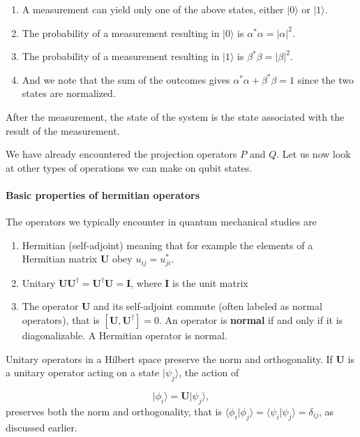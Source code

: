 \begin{enumerate}
\item A measurement can yield only one of the above states, either $\vert 0\rangle$ or $\vert 1\rangle$.

\item The probability of a measurement resulting in $\vert 0\rangle$ is $\alpha^*\alpha = \vert \alpha \vert^2$.

\item The probability of a measurement resulting in $\vert 1\rangle$ is $\beta^*\beta = \vert \beta \vert^2$.

\item And we note that the sum of the outcomes gives $\alpha^*\alpha+\beta^*\beta=1$ since the two states are normalized.
\end{enumerate}


After the measurement, the state of the system is the state associated with the result of the measurement.

We have already encountered the projection operators $P$ and $Q$. Let
us now look at other types of operations we can make on qubit states.


\paragraph{Basic properties of hermitian operators}

The operators we typically encounter in quantum mechanical studies are
\begin{enumerate}
\item Hermitian (self-adjoint) meaning that for example the elements of a Hermitian matrix $\bm{U}$ obey $u_{ij}=u_{ji}^*$.

\item Unitary $\bm{U}\bm{U}^{\dagger}=\bm{U}^{\dagger}\bm{U}=\bm{I}$, where $\bm{I}$ is the unit matrix

\item The operator $\bm{U}$ and its self-adjoint commute (often labeled as normal operators), that is  $[\bm{U},\bm{U}^{\dagger}]=0$. An operator is \textbf{normal} if and only if it is diagonalizable. A Hermitian operator is normal.
\end{enumerate}


Unitary operators in a Hilbert space preserve the norm and orthogonality. If $\bm{U}$ is a unitary operator acting on a state $\vert \psi_j\rangle$, the action of

\[
\vert \phi_i\rangle=\bm{U}\vert \psi_j\rangle,
\]
preserves both the norm and orthogonality, that is $\langle \phi_i \vert \phi_j\rangle=\langle \psi_i \vert \psi_j\rangle=\delta_{ij}$, as discussed earlier.


